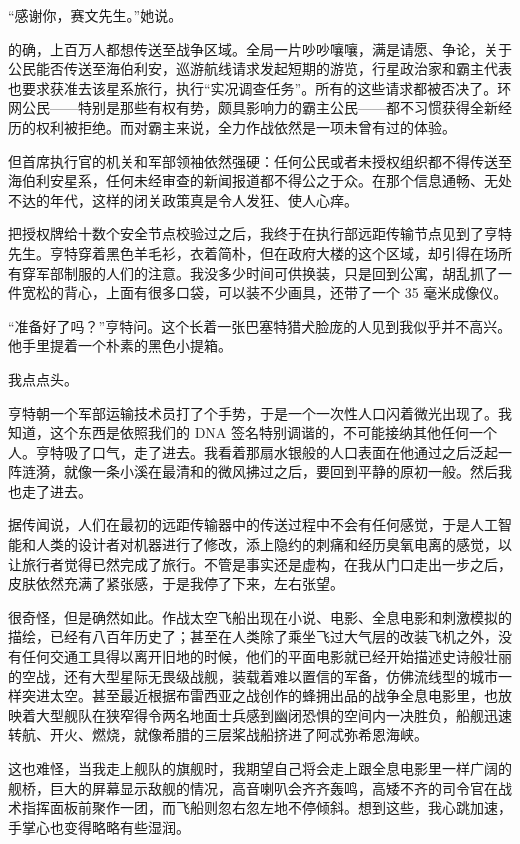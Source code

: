 \documentclass[AutoFakeBold=true]{book}
\begin{document}
``感谢你，赛文先生。''她说。

\vspace*{1em}

的确，上百万人都想传送至战争区域。全局一片吵吵嚷嚷，满是请愿、争论，关于公民能否传送至海伯利安，巡游航线请求发起短期的游览，行星政治家和霸主代表也要求获准去该星系旅行，执行``实况调查任务''。所有的这些请求都被否决了。环网公民——特别是那些有权有势，颇具影响力的霸主公民——都不习惯获得全新经历的权利被拒绝。而对霸主来说，全力作战依然是一项未曾有过的体验。

但首席执行官的机关和军部领袖依然强硬：任何公民或者未授权组织都不得传送至海伯利安星系，任何未经审查的新闻报道都不得公之于众。在那个信息通畅、无处不达的年代，这样的闭关政策真是令人发狂、使人心痒。

把授权牌给十数个安全节点校验过之后，我终于在执行部远距传输节点见到了亨特先生。亨特穿着黑色羊毛衫，衣着简朴，但在政府大楼的这个区域，却引得在场所有穿军部制服的人们的注意。我没多少时间可供换装，只是回到公寓，胡乱抓了一件宽松的背心，上面有很多口袋，可以装不少画具，还带了一个 35 毫米成像仪。

``准备好了吗？''亨特问。这个长着一张巴塞特猎犬脸庞的人见到我似乎并不高兴。他手里提着一个朴素的黑色小提箱。

我点点头。

亨特朝一个军部运输技术员打了个手势，于是一个一次性人口闪着微光出现了。我知道，这个东西是依照我们的 DNA 签名特别调谐的，不可能接纳其他任何一个人。亨特吸了口气，走了进去。我看着那扇水银般的人口表面在他通过之后泛起一阵涟漪，就像一条小溪在最清和的微风拂过之后，要回到平静的原初一般。然后我也走了进去。

据传闻说，人们在最初的远距传输器中的传送过程中不会有任何感觉，于是人工智能和人类的设计者对机器进行了修改，添上隐约的刺痛和经历臭氧电离的感觉，以让旅行者觉得已然完成了旅行。不管是事实还是虚构，在我从门口走出一步之后，皮肤依然充满了紧张感，于是我停了下来，左右张望。

很奇怪，但是确然如此。作战太空飞船出现在小说、电影、全息电影和刺激模拟的描绘，已经有八百年历史了；甚至在人类除了乘坐飞过大气层的改装飞机之外，没有任何交通工具得以离开旧地的时候，他们的平面电影就已经开始描述史诗般壮丽的空战，还有大型星际无畏级战舰，装载着难以置信的军备，仿佛流线型的城市一样突进太空。甚至最近根据布雷西亚之战创作的蜂拥出品的战争全息电影里，也放映着大型舰队在狭窄得令两名地面士兵感到幽闭恐惧的空间内一决胜负，船舰迅速转航、开火、燃烧，就像希腊的三层桨战船挤进了阿忒弥希恩海峡。

这也难怪，当我走上舰队的旗舰时，我期望自己将会走上跟全息电影里一样广阔的舰桥，巨大的屏幕显示敌舰的情况，高音喇叭会齐齐轰鸣，高矮不齐的司令官在战术指挥面板前聚作一团，而飞船则忽右忽左地不停倾斜。想到这些，我心跳加速，手掌心也变得略略有些湿润。
\end{document}
